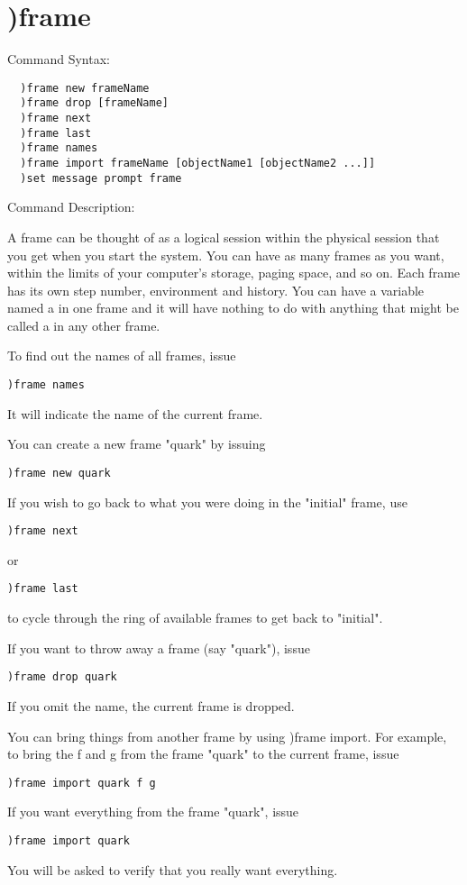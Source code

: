 \section{)frame}

Command Syntax:
\begin{verbatim}
  )frame new frameName
  )frame drop [frameName]
  )frame next
  )frame last
  )frame names
  )frame import frameName [objectName1 [objectName2 ...]]
  )set message prompt frame
\end{verbatim}
Command Description:

A frame can be thought of as a logical session within the physical session that you get when you start the system. You can have as many frames as you want, within the limits of your computer's storage, paging space, and so on. Each frame has its own step number, environment and history. You can have a variable named a in one frame and it will have nothing to do with anything that might be called a in any other frame.

To find out the names of all frames, issue
\begin{verbatim}
)frame names
\end{verbatim}
It will indicate the name of the current frame.

You can create a new frame "quark" by issuing
\begin{verbatim}
)frame new quark
\end{verbatim}
If you wish to go back to what you were doing in the "initial" frame, use
\begin{verbatim}
)frame next
\end{verbatim}
or
\begin{verbatim}
)frame last
\end{verbatim}
to cycle through the ring of available frames to get back to "initial".

If you want to throw away a frame (say "quark"), issue
\begin{verbatim}
)frame drop quark
\end{verbatim}
If you omit the name, the current frame is dropped.

You can bring things from another frame by using )frame import. For example, to bring the f and g from the frame "quark" to the current frame, issue
\begin{verbatim}
)frame import quark f g
\end{verbatim}
If you want everything from the frame "quark", issue
\begin{verbatim}
)frame import quark
\end{verbatim}
You will be asked to verify that you really want everything.

